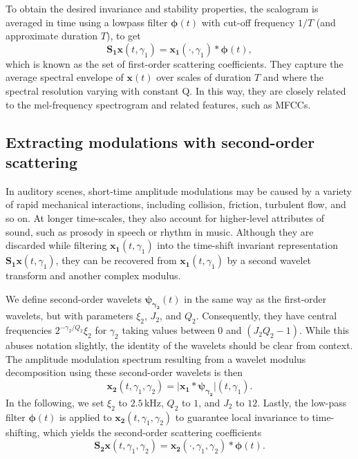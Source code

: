 \documentclass[smallextended]{svjour3}
\begin{document}
To obtain the desired invariance and stability properties, the scalogram is averaged in time using a lowpass filter $\boldsymbol{\phi}(t)$ with cut-off frequency $1/T$ (and approximate duration $T$), to get
\begin{equation}
\mathbf{S_1}\boldsymbol{x}(t, \gamma_1) = \boldsymbol{x_1}(\cdot, \gamma_1) \ast \boldsymbol{\phi}(t),
\end{equation}
which is known as the set of first-order scattering coefficients. They capture the average spectral envelope of $\boldsymbol{x}(t)$ over scales of duration $T$ and where the spectral resolution varying with constant Q. In this way, they are closely related to the mel-frequency spectrogram and related features, such as MFCCs.

\subsection{Extracting modulations with second-order scattering}
In auditory scenes, short-time amplitude modulations may be caused by a variety of rapid mechanical interactions, including collision, friction, turbulent flow, and so on.
At longer time-scales, they also account for higher-level attributes of sound, such as prosody in speech or rhythm in music.
Although they are discarded while filtering $\boldsymbol{x_1}(t,\gamma_1)$ into the time-shift invariant representation $\mathbf{S_1}\boldsymbol{x}(t,\gamma_1)$, they can be recovered from $\boldsymbol{x_1}(t,\gamma_1)$ by a second wavelet transform and another complex modulus.

We define second-order wavelets $\boldsymbol{\psi_{\gamma_2}}(t)$ in the same way as the first-order wavelets, but with parameters $\xi_2$, $J_2$, and $Q_2$. Consequently, they have central frequencies $2^{-\gamma_2/Q_2}\xi_2$ for $\gamma_2$ taking values between $0$ and $(J_2 Q_2 - 1)$. While this abuses notation slightly, the identity of the wavelets should be clear from context.
The amplitude modulation spectrum resulting from a wavelet modulus decomposition using these second-order wavelets is then
\begin{equation}
\boldsymbol{x_2}(t,\gamma_1,\gamma_2) =
\vert \boldsymbol{x_1} \ast \boldsymbol{\psi_{\gamma_2}} \vert(t,\gamma_1).
\end{equation}
In the following, we set $\xi_2$ to $2.5\,\mathrm{kHz}$, $Q_2$ to $1$, and $J_2$ to $12$. Lastly, the low-pass filter $\boldsymbol{\phi}(t)$ is applied to $\boldsymbol{x_2}(t, \gamma_1, \gamma_2)$ to guarantee local invariance to time-shifting, which yields the second-order scattering coefficients
\begin{equation}
\mathbf{S_2}\boldsymbol{x}(t,\gamma_1,\gamma_2) =
\boldsymbol{x_2}(\cdot,\gamma_1,\gamma_2) \ast \boldsymbol{\phi}(t).
\end{equation}
\end{document}
